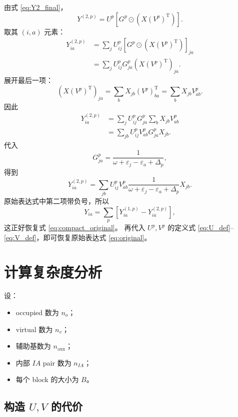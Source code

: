 \documentclass[UTF8,a4paper,11pt]{ctexart}
\newcommand{\eps}{\varepsilon}
\newcommand{\Had}{\odot}
\newcommand{\trans}{\mathrm{T}}
\begin{document}
由式 \eqref{eq:Y2_final}，
\begin{equation}
Y^{(2,p)}
=
U^p
\left[
G^p\Had \left(X(V^p)^{\trans}\right)
\right].
\end{equation}
取其 $(i,a)$ 元素：
\begin{align}
Y^{(2,p)}_{ia}
&=
\sum_j
U^p_{ij}
\left[
G^p\Had \left(X(V^p)^{\trans}\right)
\right]_{ja}
\\
&=
\sum_j
U^p_{ij}
G^p_{ja}
\left(X(V^p)^{\trans}\right)_{ja}.
\end{align}
展开最后一项：
\begin{equation}
\left(X(V^p)^{\trans}\right)_{ja}
=
\sum_b X_{jb}(V^p)^{\trans}_{ba}
=
\sum_b X_{jb}V^p_{ab}.
\end{equation}
因此
\begin{align}
Y^{(2,p)}_{ia}
&=
\sum_j
U^p_{ij}
G^p_{ja}
\sum_b X_{jb}V^p_{ab}
\\
&=
\sum_{jb}
U^p_{ij}V^p_{ab}
G^p_{ja}
X_{jb}.
\end{align}
代入
\begin{equation}
G^p_{ja}
=
\frac{1}{\omega+\eps_j-\eps_a+\Delta_p},
\end{equation}
得到
\begin{equation}
Y^{(2,p)}_{ia}
=
\sum_{jb}
U^p_{ij}V^p_{ab}
\frac{1}{\omega+\eps_j-\eps_a+\Delta_p}
X_{jb}.
\end{equation}
原始表达式中第二项带负号，所以
\begin{equation}
Y_{ia}
=
\sum_p
\left[
Y^{(1,p)}_{ia}
-
Y^{(2,p)}_{ia}
\right],
\end{equation}
这正好恢复式 \eqref{eq:compact_original}。
再代入 $U^p,V^p$ 的定义式 \eqref{eq:U_def}--\eqref{eq:V_def}，即可恢复原始表达式 \eqref{eq:original}。

\section{计算复杂度分析}

设：
\begin{itemize}
  \item occupied 数为 $n_o$；
  \item virtual 数为 $n_v$；
  \item 辅助基数为 $n_{\mathrm{aux}}$；
  \item 内部 $IA$ pair 数为 $n_{IA}$；
  \item 每个 block 的大小为 $B$。
\end{itemize}

\subsection{构造 $U,V$ 的代价}
\end{document}

